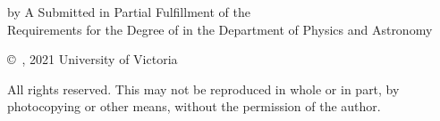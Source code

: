 \pagebreak
{
	\centering
	\thesistitle
	\tpbreak
	by
	\tpbreak
	\nameanddegrees
	\tpbreak
	A \PhDorMas Submitted in Partial Fulfillment of the \\
	Requirements for the Degree of
	\tpbreak
	\PhDorMaster
	\tpbreak
	in the Department of Physics and Astronomy\\
	\vfill
	\begin{center}
		\copyright\ \yourname, 2021 \linebreak
		\phantom{\copyright} University of Victoria
	\end{center}
	All rights reserved. This \PhDorMas may not be reproduced in whole or in part, by \\
	\hfill photocopying or other means, without the permission of the author. 
	\hfill
}
\pagebreak
